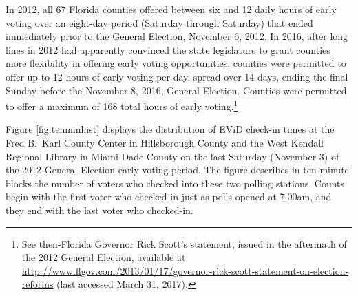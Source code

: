 \documentclass[12pt,titlepage]{article}
\begin{document}








In 2012, all 67 Florida counties offered between six and 12 daily
hours of early voting over an eight-day period (Saturday through
Saturday) that ended immediately prior to the General Election,
November 6, 2012.  In 2016, after long lines in 2012 had apparently
convinced the state legislature to grant counties more flexibility in
offering early voting opportunities, counties were permitted to offer
up to 12 hours of early voting per day, spread over 14 days, ending
the final Sunday before the November 8, 2016, General Election.
Counties were permitted to offer a maximum of 168 total hours of early
voting.\footnote{See then-Florida Governor Rick Scott's statement,
  issued in the aftermath of the 2012 General Election, available at
  \url{http://www.flgov.com/2013/01/17/governor-rick-scott-statement-on-election-reforms}
  (last accessed March 31, 2017).}

Figure \ref{fig:tenminhist} displays the distribution of EViD check-in
times at the Fred B.\ Karl County Center in Hillsborough County and
the West Kendall Regional Library in Miami-Dade County on the last
Saturday (November 3) of the 2012 General Election early voting
period. The figure describes in ten minute blocks the number of voters
who checked into these two polling stations. Counts begin with the
first voter who checked-in just as polls opened at 7:00am, and they
end with the last voter who checked-in.
\end{document}
